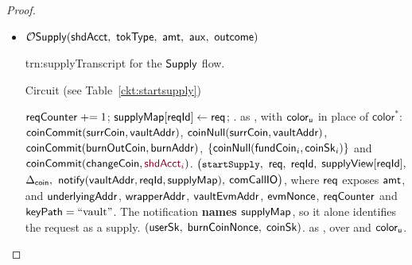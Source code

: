 \begin{proof}
\begin{itemize} [label=$\blacksquare$]
\begin{itemize}
\begin{TxtBox}{trn:swap}{Transcript for the $\Swap$ flow.}
\vspace{5pt}
 \begin{OutList}
\oitem{\Dvault} .
\oitem{\Dshd} .
\oitem{\stmt} \upd{$\bigl(\cktRefundSwap,\; \rid,\; \attSig,\; \swapView[\rid],\; \Dvault,\;
  \Dshd\bigr)$}.
\oitem{\Rel} .
\end{OutList}
\end{TxtBox}




\item $\OSup(\shdAcct\bc \tokType\bc \amt\bc \auxx\bc \outc)$

\begin{TxtBox}{trn:supply}{Transcript for the $\mathsf{Supply}$ flow.}

 Circuit \upd{$\cktStartSupply$} (see Table~\ref{ckt:startsupply})
\begin{OutList}
\oitem{\Dvault} $\mathsf{reqCounter} \mathrel{+}= 1$; \; $\mathsf{supplyMap}[\mathsf{reqId}] \gets \mathsf{req}$; \;
  .
\oitem{\Dshd} as , with $\mathsf{color}_{\mathsf{u}}$ in place of $\mathsf{color}^{*}$: \;
  \bluedot $\mathsf{coinCommit}(\mathsf{surrCoin}, \mathsf{vaultAddr})$, \; \bluedot $\mathsf{coinNull}(\mathsf{surrCoin}, \mathsf{vaultAddr})$, \;
  \bluedot $\mathsf{coinCommit}(\mathsf{burnOutCoin}, \mathsf{burnAddr})$, \;
  \bluedot $\{\mathsf{coinNull}(\mathsf{fundCoin}_i, \mathsf{coinSk}_i)\}$ and $\coinCommit(\coinChange, \secret{\srcAcct_i})$.
\oitem{\stmt} $\bigl(\texttt{\small startSupply},$ $\mathsf{req},$ $\mathsf{reqId},$ $\mathsf{supplyView}[\mathsf{reqId}],$ $\Delta_{\mathsf{coin}},$
  $\mathsf{notify}(\mathsf{vaultAddr}, \mathsf{reqId}, \mathsf{supplyMap}),$ $\mathsf{comCallIO}\bigr)$, where $\mathsf{req}$ exposes
  $\mathsf{amt}$, and  $\mathsf{underlyingAddr}$, $\mathsf{wrapperAddr}$, $\mathsf{vaultEvmAddr}$, $\mathsf{evmNonce}$, $\mathsf{reqCounter}$ and
  $\mathsf{keyPath} = \text{``vault''}$. The notification \textbf{names $\mathsf{supplyMap}$}, so it alone identifies
  the request as a supply.
\oitem{\wit} $(\mathsf{userSk},\; \mathsf{burnCoinNonce},\; \mathsf{coinSk})$.
\oitem{\Rel} as , over \upd{$\supplyView$} and $\mathsf{color}_{\mathsf{u}}$.
\end{OutList}


\end{TxtBox}
\end{itemize}
\end{itemize}
\end{proof}
